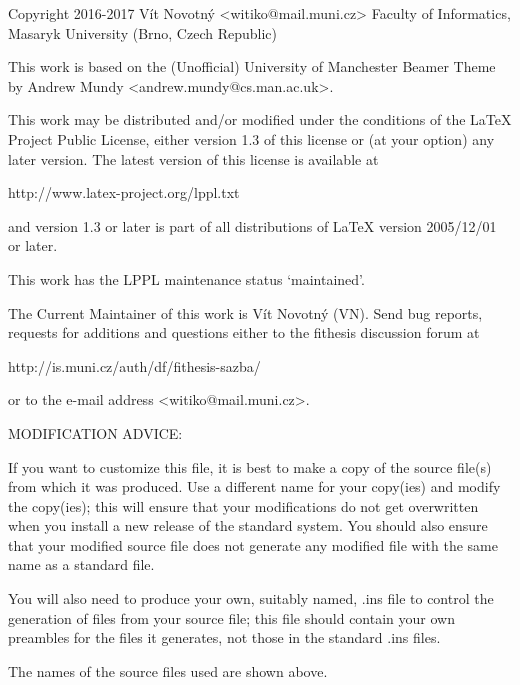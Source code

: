 
\preamble

Copyright 2016-2017  Vít Novotný <witiko@mail.muni.cz>
Faculty of Informatics, Masaryk University (Brno, Czech Republic)

This work is based on the (Unofficial) University of Manchester
Beamer Theme by Andrew Mundy <andrew.mundy@cs.man.ac.uk>.

This work may be distributed and/or modified under the
conditions of the LaTeX Project Public License, either version
1.3 of this license or (at your option) any later version.
The latest version of this license is available at

  http://www.latex-project.org/lppl.txt

and version 1.3 or later is part of all distributions of LaTeX
version 2005/12/01 or later.

This work has the LPPL maintenance status `maintained'.

The Current Maintainer of this work is Vít Novotný (VN).
Send bug reports, requests for additions and questions
either to the fithesis discussion forum at

  http://is.muni.cz/auth/df/fithesis-sazba/

or to the e-mail address <witiko@mail.muni.cz>.


MODIFICATION ADVICE:

If you want to customize this file, it is best to make a copy of
the source file(s) from which it was produced.  Use a different
name for your copy(ies) and modify the copy(ies); this will ensure
that your modifications do not get overwritten when you install a
new release of the standard system.  You should also ensure that
your modified source file does not generate any modified file with
the same name as a standard file.

You will also need to produce your own, suitably named, .ins file to
control the generation of files from your source file; this file
should contain your own preambles for the files it generates, not
those in the standard .ins files.

The names of the source files used are shown above.

\endpreamble
\askforoverwritefalse
